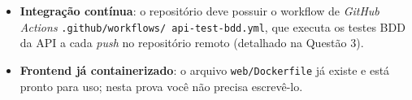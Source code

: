 \begin{itemize}
\begin{lstlisting}
# api/.env.dev
PORT=3000
MONGODB_URI=mongodb://localhost:27017/cupmatches

# web/.env.dev
VITE_API_URL=http://localhost:3000
\end{lstlisting}
  \item \textbf{Integração contínua}: o repositório deve possuir o workflow de
        \emph{GitHub Actions} \texttt{.github/\allowbreak workflows/\allowbreak
        api-test-bdd.yml}, que executa os testes BDD da API a cada \emph{push}
        no repositório remoto (detalhado na Questão 3).
  \item \textbf{Frontend já containerizado}: o arquivo \texttt{web/Dockerfile}
        já existe e está pronto para uso; nesta prova você não precisa escrevê-lo.
\end{itemize}
\endgroup
